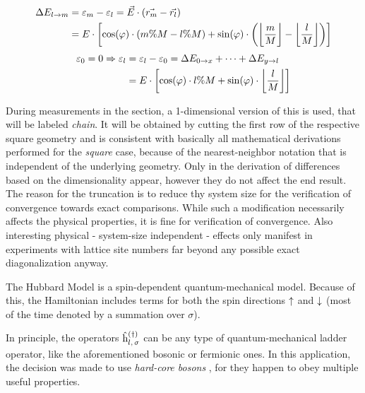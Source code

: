 \begin{equation}
    \label{eq:energy-difference-hopping}
    \begin{split}
        \Delta E_{l \rightarrow m} &=  \epsl[m] - \epsl[l] = \vec{E} \cdot \left(\vec{r_m}-\vec{r_l}\right)\\
        &= E \cdot \left[\cos(\varphi)\cdot \left(m \% M-l \% M\right) + \sin(\varphi)\cdot \left(\floor[\bigg]{\frac{m}{M}}-\floor[\bigg]{\frac{l}{M}}\right)\right]
    \end{split}
\end{equation}
\vspace{0.5cm} %
\begin{equation}
    \label{eq:epsl}
    \begin{split}
        \epsl[0] = 0 \Rightarrow
        \epsl[l] &= \epsl[l] - \epsl[0] = \Delta E_{0 \rightarrow x} + \dots + \Delta E_{y \rightarrow l}\\
        &= E \cdot \left[\cos(\varphi)\cdot l \% M + \sin(\varphi)\cdot \floor[\bigg]{\frac{l}{M}}\right]
    \end{split}
\end{equation}

During measurements in the  section, a 1-dimensional version of this is used, that will be labeled \emph{chain}. 
It will be obtained by cutting the first row of the respective square geometry and is consistent with basically all mathematical derivations performed for the \emph{square} case, because of the nearest-neighbor notation that is independent of the underlying geometry. Only in the derivation of  differences based on the dimensionality appear, however they do not affect the end result.
The reason for the truncation is to reduce thy system size for the verification of convergence towards exact comparisons.
While such a modification necessarily affects the physical properties, it is fine for verification of convergence.
Also interesting physical - system-size independent - effects only manifest in experiments with lattice site numbers far beyond any possible exact diagonalization anyway.

The Hubbard Model \cite{hubbardModelOriginalDerivation} is a spin-dependent quantum-mechanical model. 
Because of this, the Hamiltonian includes terms for both the spin directions $\up$ and $\down$ (most of the time denoted by a summation over $\sigma$).

In principle, the operators $\withspinhcop[]{l}{\sigma}{(\dagger)}$ can be any type of quantum-mechanical ladder operator, like the aforementioned bosonic or fermionic ones.
In this application, the decision was made to use \emph{hard-core bosons} \cite[]{hardCoreBosonsBasics}, for they happen to obey multiple useful properties.

